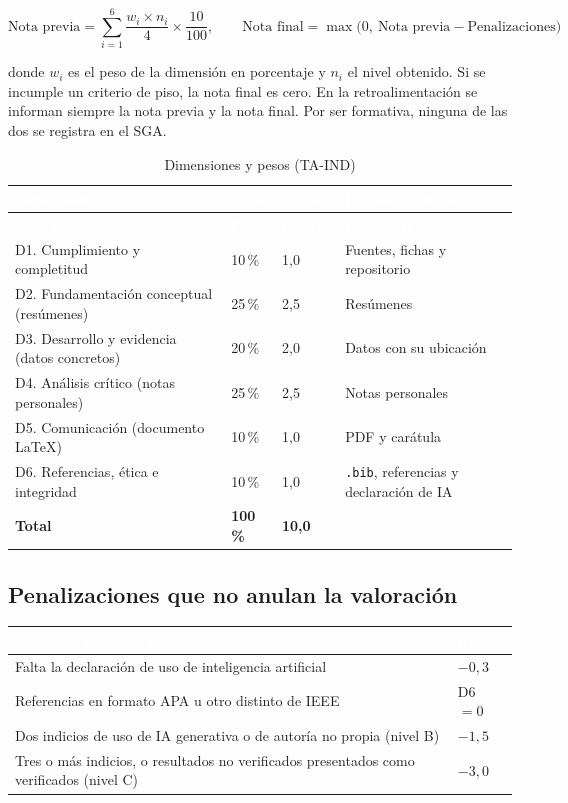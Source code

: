 \documentclass[11pt,a4paper]{article}
\newcommand{\hdr}[1]{\textcolor{white}{\textbf{#1}}}
\begin{document}
\[
\text{Nota previa} = \sum_{i=1}^{6} \frac{w_i \times n_i}{4} \times \frac{10}{100}, \qquad \text{Nota final} = \max\bigl(0,\ \text{Nota previa} - \text{Penalizaciones}\bigr)
\]

donde $w_i$ es el peso de la dimensión en porcentaje y $n_i$ el nivel obtenido. Si se incumple un criterio de piso, la nota final es cero. En la retroalimentación se informan siempre la nota previa y la nota final. Por ser formativa, ninguna de las dos se registra en el SGA.

\begin{xltabular}{\linewidth}{@{}L{6.2cm}C{1.3cm}C{1.5cm}Y@{}}
	\caption{Dimensiones y pesos (TA-IND)}\label{tab:pesos}\\
	\toprule
	\hdr{Dimensión} & \hdr{Peso} & \hdr{Puntos} & \hdr{Producto que se mira} \\
	\midrule
	\endfirsthead
	\toprule
	\hdr{Dimensión} & \hdr{Peso} & \hdr{Puntos} & \hdr{Producto que se mira} \\
	\midrule
	\endhead
	D1. Cumplimiento y completitud & 10\,\% & 1,0 & Fuentes, fichas y repositorio \\
	D2. Fundamentación conceptual (resúmenes) & 25\,\% & 2,5 & Resúmenes \\
	D3. Desarrollo y evidencia (datos concretos) & 20\,\% & 2,0 & Datos con su ubicación \\
	D4. Análisis crítico (notas personales) & 25\,\% & 2,5 & Notas personales \\
	D5. Comunicación (documento \LaTeX) & 10\,\% & 1,0 & PDF y carátula \\
	D6. Referencias, ética e integridad & 10\,\% & 1,0 & \texttt{.bib}, referencias y declaración de IA \\
	\midrule
	\textbf{Total} & \textbf{100\,\%} & \textbf{10,0} & \\
	\bottomrule
\end{xltabular}

\subsection{Penalizaciones que no anulan la valoración}

\begin{xltabular}{\linewidth}{@{}YC{3.2cm}@{}}
	\toprule
	\hdr{Situación detectada} & \hdr{Efecto} \\
	\midrule
	\endhead
	Falta la declaración de uso de inteligencia artificial & $-0{,}3$ \\
	Referencias en formato APA u otro distinto de IEEE & D6 $=0$ \\
	Dos indicios de uso de IA generativa o de autoría no propia (nivel B) & $-1{,}5$ \\
	Tres o más indicios, o resultados no verificados presentados como verificados (nivel C) & $-3{,}0$ \\
	\bottomrule
\end{xltabular}
\end{document}
